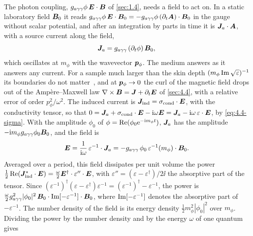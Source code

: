 The photon coupling, $g_{a\gamma\gamma}\phi\,\bm{E}\cdot\bm{B}$ of \cref{sec:1.4}, needs a field to act on. In a static laboratory field $\bm{B}_0$ it reads $g_{a\gamma\gamma}\phi\,\bm{E}\cdot\bm{B}_0 = -g_{a\gamma\gamma}\phi\,(\partial_t\bm{A})\cdot\bm{B}_0$ in the gauge without scalar potential, and after an integration by parts in time it is $\bm{J}_a\cdot\bm{A}$, with a source current along the field,
\begin{equation*}
  \bm{J}_a = g_{a\gamma\gamma}\,(\partial_t\phi)\,\bm{B}_0 ,
\end{equation*}
which oscillates at $m_\phi$ with the wavevector $\bm{p}_\phi$. The medium answers as it answers any current. For a sample much larger than the skin depth $(m_\phi\operatorname{Im}\sqrt{\varepsilon})^{-1}$ its boundaries do not matter~\cite[footnote~1]{berlin2024absorption}, and at $\bm{p}_\phi \to 0$ the curl of the magnetic field drops out of the Amp\`ere--Maxwell law $\nabla\times\bm{B} = \bm{J} + \partial_t\bm{E}$ of \cref{sec:4.4}, with a relative error of order $p_\phi^2/\omega^2$. The induced current is $\bm{J}_{\mathrm{ind}} = \sigma_{\mathrm{cond}}\cdot\bm{E}$, with the conductivity tensor, so that $0 = \bm{J}_a + \sigma_{\mathrm{cond}}\cdot\bm{E} - \mathrm{i}\omega\bm{E} = \bm{J}_a - \mathrm{i}\omega\,\varepsilon\cdot\bm{E}$, by \cref{eq:4.4-sigma}. With the amplitude $\phi_0$ of $\phi = \operatorname{Re}(\phi_0\mathrm{e}^{-\mathrm{i} m_\phi t})$, $\bm{J}_a$ has the amplitude $-\mathrm{i} m_\phi g_{a\gamma\gamma}\phi_0\bm{B}_0$, and the field is
\begin{equation*}
  \bm{E} = \frac{1}{\mathrm{i}\omega}\,\varepsilon^{-1}\cdot\bm{J}_a = -g_{a\gamma\gamma}\,\phi_0\,\varepsilon^{-1}(m_\phi)\cdot\bm{B}_0 .
\end{equation*}
Averaged over a period, this field dissipates per unit volume the power $\frac12\operatorname{Re}(\bm{J}^*_{\mathrm{ind}}\cdot\bm{E}) = \frac{\omega}{2}\bm{E}^\dagger\cdot\varepsilon''\cdot\bm{E}$, with $\varepsilon'' = (\varepsilon - \varepsilon^\dagger)/2\ii$ the absorptive part of the tensor. Since $(\varepsilon^{-1})^\dagger(\varepsilon - \varepsilon^\dagger)\varepsilon^{-1} = (\varepsilon^{-1})^\dagger - \varepsilon^{-1}$, the power is $\frac{\omega}{2}g_{a\gamma\gamma}^2|\phi_0|^2\,\bm{B}_0\cdot\operatorname{Im}[-\varepsilon^{-1}]\cdot\bm{B}_0$, where $\operatorname{Im}[-\varepsilon^{-1}]$ denotes the absorptive part of $-\varepsilon^{-1}$. The number density of the field is its energy density $\frac12m_\phi^2|\phi_0|^2$ over $m_\phi$. Dividing the power by the number density and by the energy $\omega$ of one quantum gives
